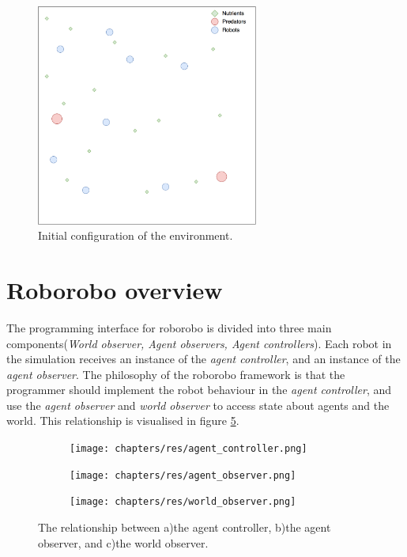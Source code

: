 \begin{figure}[H]
	
	\centering
	\includegraphics[width=0.65\textwidth]{chapters/res/Environment.png}
	\caption{Initial configuration of the environment.}
	\label{fig:environment}
\end{figure}

\section{Roborobo overview}
The programming interface for roborobo is divided into three main components(\emph{World observer, Agent observers, Agent controllers}).
Each robot in the simulation receives an instance of the \emph{agent controller}, and an instance of the \emph{agent observer}.
The philosophy of the roborobo framework is that the programmer should implement the robot behaviour in the \emph{agent controller}, and use the \emph{agent observer} and \emph{world observer} to access state about agents and the world.
This relationship is visualised in figure \ref{fig:component-relationship}.

\begin{figure}[H]
	\centering
	\begin{subfigure}{0.31\textwidth}
		\label{fig:controller}
		\centering
		\hspace*{1.15cm}\texttt{[image: chapters/res/agent\_controller.png]}
		\caption{}
	\end{subfigure}
	\begin{subfigure}{0.31\textwidth}
		\label{fig:agent-observer}
		\centering
		\texttt{[image: chapters/res/agent\_observer.png]}
		\caption{}
	\end{subfigure}
	\begin{subfigure}{0.31\textwidth}
		\label{fig:world-observer}
		\centering
		\texttt{[image: chapters/res/world\_observer.png]}
		\caption{}
	\end{subfigure}
	\caption{The relationship between a)the agent controller, b)the agent observer, and c)the world observer. }
	\label{fig:component-relationship}
\end{figure}

